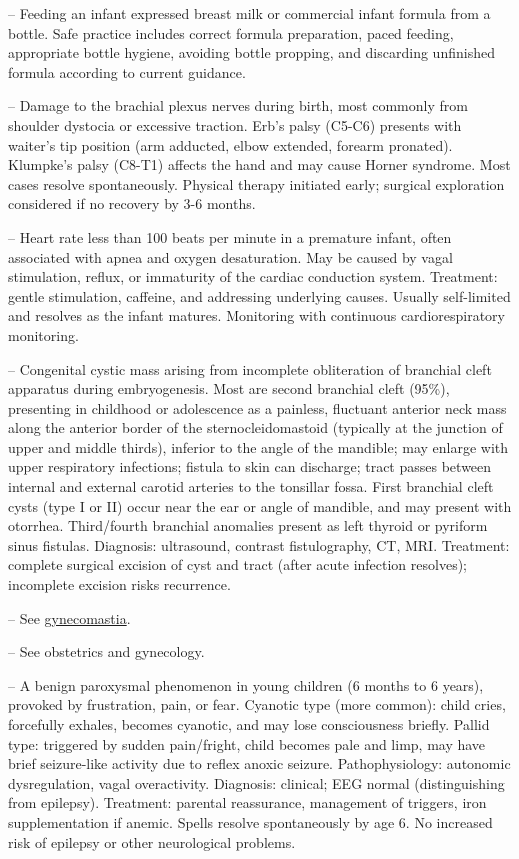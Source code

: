 -- Feeding an infant expressed breast milk or commercial infant formula from a bottle. Safe practice includes correct formula preparation, paced feeding, appropriate bottle hygiene, avoiding bottle propping, and discarding unfinished formula according to current guidance.

-- Damage to the brachial plexus nerves during birth, most commonly from shoulder dystocia or excessive traction. Erb's palsy (C5-C6) presents with waiter's tip position (arm adducted, elbow extended, forearm pronated). Klumpke's palsy (C8-T1) affects the hand and may cause Horner syndrome. Most cases resolve spontaneously. Physical therapy initiated early; surgical exploration considered if no recovery by 3-6 months.

-- Heart rate less than 100 beats per minute in a premature infant, often associated with apnea and oxygen desaturation. May be caused by vagal stimulation, reflux, or immaturity of the cardiac conduction system. Treatment: gentle stimulation, caffeine, and addressing underlying causes. Usually self-limited and resolves as the infant matures. Monitoring with continuous cardiorespiratory monitoring.

-- Congenital cystic mass arising from incomplete obliteration of branchial cleft apparatus during embryogenesis. Most are second branchial cleft (95\%), presenting in childhood or adolescence as a painless, fluctuant anterior neck mass along the anterior border of the sternocleidomastoid (typically at the junction of upper and middle thirds), inferior to the angle of the mandible; may enlarge with upper respiratory infections; fistula to skin can discharge; tract passes between internal and external carotid arteries to the tonsillar fossa. First branchial cleft cysts (type I or II) occur near the ear or angle of mandible, and may present with otorrhea. Third/fourth branchial anomalies present as left thyroid or pyriform sinus fistulas. Diagnosis: ultrasound, contrast fistulography, CT, MRI. Treatment: complete surgical excision of cyst and tract (after acute infection resolves); incomplete excision risks recurrence.

-- See \hyperlink{Gynecomastia}{gynecomastia}.

-- See obstetrics and gynecology.

-- A benign paroxysmal phenomenon in young children (6 months to 6 years), provoked by frustration, pain, or fear. Cyanotic type (more common): child cries, forcefully exhales, becomes cyanotic, and may lose consciousness briefly. Pallid type: triggered by sudden pain/fright, child becomes pale and limp, may have brief seizure-like activity due to reflex anoxic seizure. Pathophysiology: autonomic dysregulation, vagal overactivity. Diagnosis: clinical; EEG normal (distinguishing from epilepsy). Treatment: parental reassurance, management of triggers, iron supplementation if anemic. Spells resolve spontaneously by age 6. No increased risk of epilepsy or other neurological problems.

